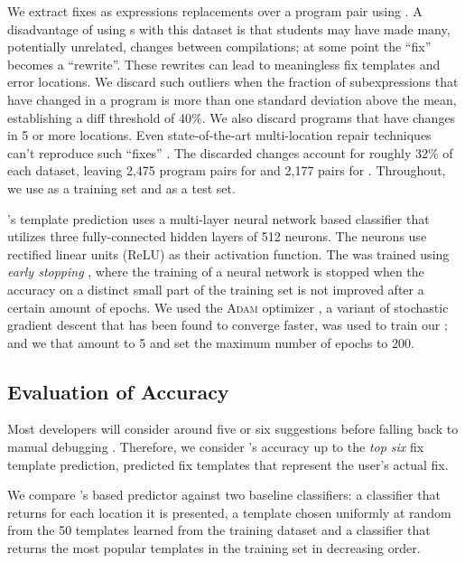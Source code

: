 %
We extract fixes as expressions replacements over a program pair using \diffsym.
A disadvantage of using \diffsym s with this dataset is that students may have
made many, potentially unrelated, changes between compilations; at some point
the ``fix'' becomes a ``rewrite''. These rewrites can lead to
meaningless fix templates and error locations. We discard such outliers when the
fraction of subexpressions that have changed in a program is more than one
standard deviation above the mean, establishing a diff threshold of 40\%. We
also discard programs that have changes in 5 or more locations. Even
state-of-the-art multi-location repair techniques can't reproduce such ``fixes''
\citep{Saha_2019}. The discarded changes account for roughly 32\% of each
dataset, leaving 2,475 program pairs for \SPRING and 2,177 pairs for \FALL.
Throughout, we use \SPRING as a training set and \FALL as a test set.

%
\toolname's template prediction 
uses a multi-layer neural network \dnn based 
classifier that utilizes three fully-connected 
hidden layers of 512 neurons. The neurons use
rectified linear units (ReLU) as their activation 
function.
%
The \dnn was trained using \emph{early stopping} 
\cite{Hastie2009-bn}, where the training of a neural 
network is stopped when the accuracy on a distinct 
small part of the training set is not improved after 
a certain amount of epochs.
%
We used the \textsc{Adam} optimizer \citep{Kingma2014-ng}, 
a variant of stochastic gradient descent that has 
been found to converge faster, was used to train 
our \dnn; and we that amount to 5  
and set the maximum number of epochs to 200. 

\subsection{Evaluation of Accuracy}

\label{sec:eval:accuracy}

Most developers will consider around five or six suggestions before
falling back to manual debugging \citep{Kochhar2016-oc}. 
%
Therefore, we consider \toolname's accuracy up to the \emph{top six} 
fix template prediction, \ie predicted fix templates that represent 
the user's actual fix. 

%
We compare \toolname's \dnn based predictor against two baseline 
classifiers: a \random classifier that returns 
for each location it is presented, a template 
chosen uniformly at random from the 50 templates 
learned from the \SPRING training dataset and 
a \popular classifier that returns the most 
popular templates in the training set in 
decreasing order. 

